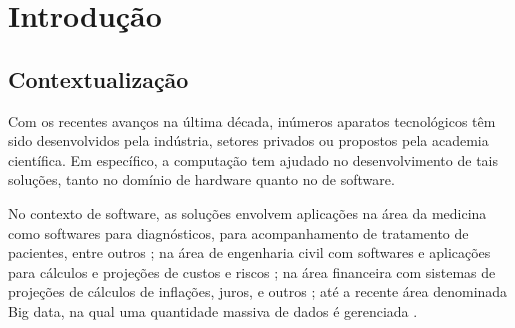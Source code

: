 \documentclass[quali]{ppgccufscar}
\begin{document}
\listoffigures
\listoftables




\listofacronyms

\tableofcontents





\chapter{Introdução}

\section{Contextualização}

Com os recentes avanços na última década, inúmeros aparatos tecnológicos têm sido desenvolvidos pela indústria, setores privados ou propostos pela academia científica. Em específico, a computação tem ajudado no desenvolvimento de tais soluções, tanto no domínio de hardware quanto no de software.

No contexto de software, as soluções envolvem aplicações na área da medicina como softwares para diagnósticos, para acompanhamento de tratamento de pacientes, entre outros \cite{sommerville2010}; na área de engenharia civil com softwares e aplicações para cálculos e projeções de custos e riscos \cite{ribeiro2016}; na área financeira com sistemas de projeções de cálculos de inflações, juros, e outros \cite{costa2012}; até a recente área denominada Big data, na qual uma quantidade massiva de dados é gerenciada \cite{hp2016}.
\end{document}
